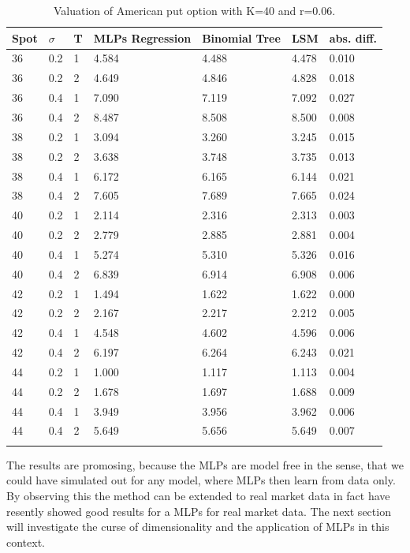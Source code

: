 \begin{table}[th]
\caption{Valuation of American put option with K=40 and r=0.06.}
\label{tab:treatments}
\centering
\begin{tabular}{l l l l l l l }
\toprule
\textbf{Spot} & \textbf{$\sigma$} & \textbf{T} & \textbf{MLPs Regression} & \textbf{Binomial Tree} & \textbf{LSM} & \textbf{abs. diff.} \\
\midrule
36 & 0.2 & 1 & 4.584 & 4.488 & 4.478 & 0.010\\
36 & 0.2 & 2 & 4.649 & 4.846 & 4.828 & 0.018\\
36 & 0.4 & 1 & 7.090 & 7.119 & 7.092 & 0.027\\
36 & 0.4 & 2 & 8.487 & 8.508 & 8.500 & 0.008\\
38 & 0.2 & 1 & 3.094 & 3.260 & 3.245 & 0.015\\
38 & 0.2 & 2 & 3.638 & 3.748 & 3.735 & 0.013\\
38 & 0.4 & 1 & 6.172 & 6.165 & 6.144 & 0.021\\
38 & 0.4 & 2 & 7.605 & 7.689 & 7.665 & 0.024\\
40 & 0.2 & 1 & 2.114 & 2.316 & 2.313 & 0.003\\
40 & 0.2 & 2 & 2.779 & 2.885 & 2.881 & 0.004\\
40 & 0.4 & 1 & 5.274 & 5.310 & 5.326 & 0.016\\
40 & 0.4 & 2 & 6.839 & 6.914 & 6.908 & 0.006\\
42 & 0.2 & 1 & 1.494 & 1.622 & 1.622 & 0.000\\
42 & 0.2 & 2 & 2.167 & 2.217 & 2.212 & 0.005\\
42 & 0.4 & 1 & 4.548 & 4.602 & 4.596 & 0.006\\
42 & 0.4 & 2 & 6.197 & 6.264 & 6.243 & 0.021\\
44 & 0.2 & 1 & 1.000 & 1.117 & 1.113 & 0.004\\
44 & 0.2 & 2 & 1.678 & 1.697 & 1.688 & 0.009\\
44 & 0.4 & 1 & 3.949 & 3.956 & 3.962 & 0.006\\
44 & 0.4 & 2 & 5.649 & 5.656 & 5.649 & 0.007\\
\bottomrule\\
\end{tabular}
\end{table}


The results are promosing, because the MLPs are model free in the sense, that we could have simulated out for any model, where MLPs then learn from data only. By observing this the method can be extended to real market data in fact \parencite{GasparRaquel20} have resently showed good results for a MLPs for real market data. The next section will investigate the curse of dimensionality and the application of MLPs in this context.

